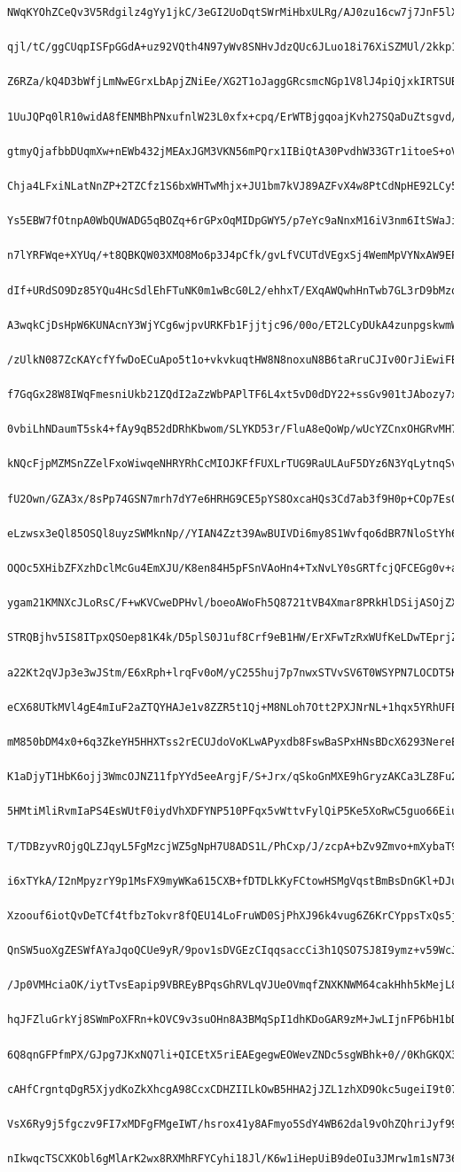 \documentclass[
    article,            %
    11pt,               %
    oneside,            %
    a4paper,            %
    english,            %
    brazil,             %
    sumario=tradicional,
    ]{abntex2}
\begin{document}
\begin{Verbatim}[frame=single, commandchars=\\\{\}, fontsize=\footnotesize]
    NWqKYOhZCeQv3V5Rdgilz4gYy1jkC/3eGI2UoDqtSWrMiHbxULRg/AJ0zu16cw7j7JnF5lXl
    qjl/tC/ggCUqpISFpGGdA+uz92VQth4N97yWv8SNHvJdzQUc6JLuo18i76XiSZMUl/2kkp15
    Z6RZa/kQ4D3bWfjLmNwEGrxLbApjZNiEe/XG2T1oJaggGRcsmcNGp1V8lJ4piQjxkIRTSUB0
    1UuJQPq0lR10widA8fENMBhPNxufnlW23L0xfx+cpq/ErWTBjgqoajKvh27SQaDuZtsgvd//
    gtmyQjafbbDUqmXw+nEWb432jMEAxJGM3VKN56mPQrx1IBiQtA30PvdhW33GTr1itoeS+oVQ
    Chja4LFxiNLatNnZP+2TZCfz1S6bxWHTwMhjx+JU1bm7kVJ89AZFvX4w8PtCdNpHE92LCy5t
    Ys5EBW7fOtnpA0WbQUWADG5qBOZq+6rGPxOqMIDpGWY5/p7eYc9aNnxM16iV3nm6ItSWaJiK
    n7lYRFWqe+XYUq/+t8QBKQW03XMO8Mo6p3J4pCfk/gvLfVCUTdVEgxSj4WemMpVYNxAW9EPl
    dIf+URdSO9Dz85YQu4HcSdlEhFTuNK0m1wBcG0L2/ehhxT/EXqAWQwhHnTwb7GL3rD9bMzqs
    A3wqkCjDsHpW6KUNAcnY3WjYCg6wjpvURKFb1Fjjtjc96/00o/ET2LCyDUkA4zunpgskwmWK
    /zUlkN087ZcKAYcfYfwDoECuApo5t1o+vkvkuqtHW8N8noxuN8B6taRruCJIv0OrJiEwiFBq
    f7GqGx28W8IWqFmesniUkb21ZQdI2aZzWbPAPlTF6L4xt5vD0dDY22+ssGv901tJAbozy7xH
    0vbiLhNDaumT5sk4+fAy9qB52dDRhKbwom/SLYKD53r/FluA8eQoWp/wUcYZCnxOHGRvMH7O
    kNQcFjpMZMSnZZelFxoWiwqeNHRYRhCcMIOJKFfFUXLrTUG9RaULAuF5DYz6N3YqLytnqSv/
    fU2Own/GZA3x/8sPp74GSN7mrh7dY7e6HRHG9CE5pYS8OxcaHQs3Cd7ab3f9H0p+COp7Es0l
    eLzwsx3eQl85OSQl8uyzSWMknNp//YIAN4Zzt39AwBUIVDi6my8S1Wvfqo6dBR7NloStYh6Z
    OQOc5XHibZFXzhDclMcGu4EmXJU/K8en84H5pFSnVAoHn4+TxNvLY0sGRTfcjQFCEGg0v+ah
    ygam21KMNXcJLoRsC/F+wKVCweDPHvl/boeoAWoFh5Q8721tVB4Xmar8PRkHlDSijASOjZX2
    STRQBjhv5IS8ITpxQSOep81K4k/D5plS0J1uf8Crf9eB1HW/ErXFwTzRxWUfKeLDwTEprjZ6
    a22Kt2qVJp3e3wJStm/E6xRph+lrqFv0oM/yC255huj7p7nwxSTVvSV6T0WSYPN7LOCDT5Kg
    eCX68UTkMVl4gE4mIuF2aZTQYHAJe1v8ZZR5t1Qj+M8NLoh7Ott2PXJNrNL+1hqx5YRhUFEq
    mM850bDM4x0+6q3ZkeYH5HHXTss2rECUJdoVoKLwAPyxdb8FswBaSPxHNsBDcX6293NereEa
    K1aDjyT1HbK6ojj3WmcOJNZ11fpYYd5eeArgjF/S+Jrx/qSkoGnMXE9hGryzAKCa3LZ8Fu2v
    5HMtiMliRvmIaPS4EsWUtF0iydVhXDFYNP510PFqx5vWttvFylQiP5Ke5XoRwC5guo66EiuR
    T/TDBzyvROjgQLZJqyL5FgMzcjWZ5gNpH7U8ADS1L/PhCxp/J/zcpA+bZv9Zmvo+mXybaT9P
    i6xTYkA/I2nMpyzrY9p1MsFX9myWKa615CXB+fDTDLkKyFCtowHSMgVqstBmBsDnGKl+DJuo
    Xzoouf6iotQvDeTCf4tfbzTokvr8fQEU14LoFruWD0SjPhXJ96k4vug6Z6KrCYppsTxQs5js
    QnSW5uoXgZESWfAYaJqoQCUe9yR/9pov1sDVGEzCIqqsaccCi3h1QSO7SJ8I9ymz+v59WcJU
    /Jp0VMHciaOK/iytTvsEapip9VBREyBPqsGhRVLqVJUeOVmqfZNXKNWM64cakHhh5kMejL87
    hqJFZluGrkYj8SWmPoXFRn+kOVC9v3suOHn8A3BMqSpI1dhKDoGAR9zM+JwLIjnFP6bH1bDP
    6Q8qnGFPfmPX/GJpg7JKxNQ7li+QICEtX5riEAEgegwEOWevZNDc5sgWBhk+0//0KhGKQX3o
    cAHfCrgntqDgR5XjydKoZkXhcgA98CcxCDHZIILkOwB5HHA2jJZL1zhXD9Okc5ugeiI9t079
    VsX6Ry9j5fgczv9FI7xMDFgFMgeIWT/hsrox41y8AFmyo5SdY4WB62dal9vOhZQhriJyf99+
    nIkwqcTSCXKObl6gMlArK2wx8RXMhRFYCyhi18Jl/K6w1iHepUiB9deOIu3JMrw1m1sN736V

\end{Verbatim}
\end{document}
